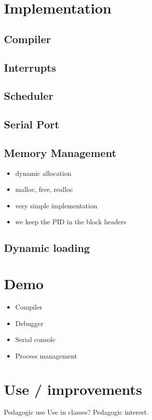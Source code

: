 \documentclass{beamer}
\begin{document}
  \section{Implementation}

    \subsection{Compiler}

    \subsection{Interrupts}

    \subsection{Scheduler}

    \subsection{Serial Port}

    \subsection{Memory Management}
    
    \begin{frame}
      \begin{itemize}
        \item dynamic allocation
        \item malloc, free, realloc
        \item very simple implementation
        \item we keep the PID in the block headers
      \end{itemize}
    \end{frame}

    \subsection{Dynamic loading}

  \section{Demo}

  \begin{frame}
    \begin{itemize}
      \item Compiler
      \item Debugger
      \item Serial console
      \item Process management
    \end{itemize}
  \end{frame}

  \section{Use / improvements}

  \begin{frame}{Pedagogic use}
      Use in classes? Pedagogic interest.
  \end{frame}
\end{document}
